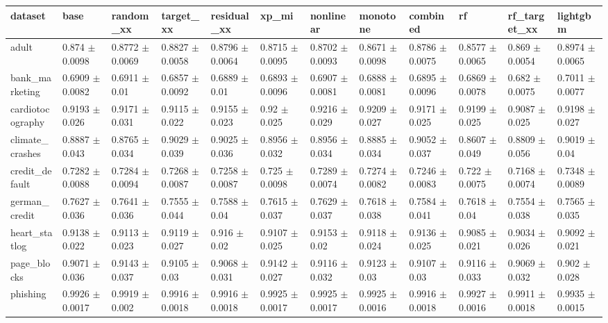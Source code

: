 \begin{tabular}{llllllllllll}
\toprule
dataset & base & random\_xx & target\_xx & residual\_xx & xp\_mi & nonlinear & monotone & combined & rf & rf\_target\_xx & lightgbm \\
\midrule
adult & 0.874 $\pm$ 0.0098 & 0.8772 $\pm$ 0.0069 & 0.8827 $\pm$ 0.0058 & 0.8796 $\pm$ 0.0064 & 0.8715 $\pm$ 0.0095 & 0.8702 $\pm$ 0.0093 & 0.8671 $\pm$ 0.0098 & 0.8786 $\pm$ 0.0075 & 0.8577 $\pm$ 0.0065 & 0.869 $\pm$ 0.0054 & 0.8974 $\pm$ 0.0065 \\
bank\_marketing & 0.6909 $\pm$ 0.0082 & 0.6911 $\pm$ 0.01 & 0.6857 $\pm$ 0.0092 & 0.6889 $\pm$ 0.01 & 0.6893 $\pm$ 0.0096 & 0.6907 $\pm$ 0.0081 & 0.6888 $\pm$ 0.0081 & 0.6895 $\pm$ 0.0096 & 0.6869 $\pm$ 0.0078 & 0.682 $\pm$ 0.0075 & 0.7011 $\pm$ 0.0077 \\
cardiotocography & 0.9193 $\pm$ 0.026 & 0.9171 $\pm$ 0.031 & 0.9115 $\pm$ 0.022 & 0.9155 $\pm$ 0.023 & 0.92 $\pm$ 0.025 & 0.9216 $\pm$ 0.029 & 0.9209 $\pm$ 0.027 & 0.9171 $\pm$ 0.025 & 0.9199 $\pm$ 0.025 & 0.9087 $\pm$ 0.025 & 0.9198 $\pm$ 0.027 \\
climate\_crashes & 0.8887 $\pm$ 0.043 & 0.8765 $\pm$ 0.034 & 0.9029 $\pm$ 0.039 & 0.9025 $\pm$ 0.036 & 0.8956 $\pm$ 0.032 & 0.8956 $\pm$ 0.034 & 0.8885 $\pm$ 0.034 & 0.9052 $\pm$ 0.037 & 0.8607 $\pm$ 0.049 & 0.8809 $\pm$ 0.056 & 0.9019 $\pm$ 0.04 \\
credit\_default & 0.7282 $\pm$ 0.0088 & 0.7284 $\pm$ 0.0094 & 0.7268 $\pm$ 0.0087 & 0.7258 $\pm$ 0.0087 & 0.725 $\pm$ 0.0098 & 0.7289 $\pm$ 0.0074 & 0.7274 $\pm$ 0.0082 & 0.7246 $\pm$ 0.0083 & 0.722 $\pm$ 0.0075 & 0.7168 $\pm$ 0.0074 & 0.7348 $\pm$ 0.0089 \\
german\_credit & 0.7627 $\pm$ 0.036 & 0.7641 $\pm$ 0.036 & 0.7555 $\pm$ 0.044 & 0.7588 $\pm$ 0.04 & 0.7615 $\pm$ 0.037 & 0.7629 $\pm$ 0.037 & 0.7618 $\pm$ 0.038 & 0.7584 $\pm$ 0.041 & 0.7618 $\pm$ 0.04 & 0.7554 $\pm$ 0.038 & 0.7565 $\pm$ 0.035 \\
heart\_statlog & 0.9138 $\pm$ 0.022 & 0.9113 $\pm$ 0.023 & 0.9119 $\pm$ 0.027 & 0.916 $\pm$ 0.02 & 0.9107 $\pm$ 0.025 & 0.9153 $\pm$ 0.02 & 0.9118 $\pm$ 0.024 & 0.9136 $\pm$ 0.025 & 0.9085 $\pm$ 0.021 & 0.9034 $\pm$ 0.026 & 0.9092 $\pm$ 0.021 \\
page\_blocks & 0.9071 $\pm$ 0.036 & 0.9143 $\pm$ 0.037 & 0.9105 $\pm$ 0.03 & 0.9068 $\pm$ 0.031 & 0.9142 $\pm$ 0.027 & 0.9116 $\pm$ 0.032 & 0.9123 $\pm$ 0.03 & 0.9107 $\pm$ 0.03 & 0.9116 $\pm$ 0.033 & 0.9069 $\pm$ 0.032 & 0.902 $\pm$ 0.028 \\
phishing & 0.9926 $\pm$ 0.0017 & 0.9919 $\pm$ 0.002 & 0.9916 $\pm$ 0.0018 & 0.9916 $\pm$ 0.0018 & 0.9925 $\pm$ 0.0017 & 0.9925 $\pm$ 0.0017 & 0.9925 $\pm$ 0.0016 & 0.9916 $\pm$ 0.0018 & 0.9927 $\pm$ 0.0016 & 0.9911 $\pm$ 0.0018 & 0.9935 $\pm$ 0.0015 \\

\end{tabular}
